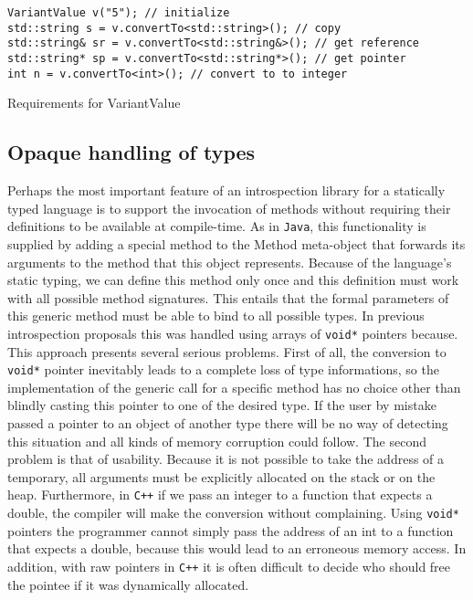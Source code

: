 \begin{listing}[H]
\begin{verbatim}
VariantValue v("5"); // initialize
std::string s = v.convertTo<std::string>(); // copy
std::string& sr = v.convertTo<std::string&>(); // get reference
std::string* sp = v.convertTo<std::string*>(); // get pointer
int n = v.convertTo<int>(); // convert to to integer
\end{verbatim}
\caption{Requirements for VariantValue}
\label{lst:listing5}
\end{listing}


\subsection{Opaque handling of types}
\label{sec:variant}

Perhaps the most important feature of an introspection library for a statically typed language is to support the invocation
of methods without requiring their definitions to be available at compile-time. As in \texttt{Java}, this functionality is supplied by adding
a special method to the Method meta-object that forwards its arguments to the method that this object represents.
Because of the language's static typing, we can define this method only once and this definition must work with all possible method
signatures. This entails that the formal parameters of this generic method must be able to bind to all possible types.
In previous introspection proposals this was handled using arrays of \texttt{void*} pointers because. This approach presents several
serious problems. First of all, the conversion to \texttt{void*} pointer inevitably leads to a complete loss of type informations,
so the implementation of the generic call for a specific method has no choice other than blindly casting this pointer to one
of the desired type. If the user by mistake passed a pointer to an object of another type there will be no way of detecting this
situation and all kinds of memory corruption could follow. The second problem is that of usability. Because it is not possible
to take the address of a temporary, all arguments must be explicitly allocated on the stack or on the heap. Furthermore, in \texttt{C++}
if we pass an integer to a function that expects a double, the compiler will make the conversion without complaining. Using
\texttt{void*} pointers the programmer cannot simply pass the address of an int to a function that expects a double, because
this would lead to an erroneous memory access. In addition, with raw pointers in \texttt{C++} it is often difficult to decide who should
free the pointee if it was dynamically allocated.

